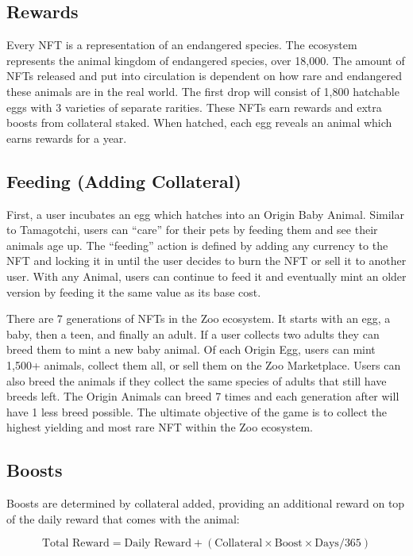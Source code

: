 \subsection{Rewards}

Every NFT is a representation of an endangered species. The ecosystem represents the animal kingdom of endangered species, over 18{,}000. The amount of NFTs released and put into circulation is dependent on how rare and endangered these animals are in the real world. The first drop will consist of 1{,}800 hatchable eggs with 3 varieties of separate rarities. These NFTs earn rewards and extra boosts from collateral staked. When hatched, each egg reveals an animal which earns rewards for a year.

\subsection{Feeding (Adding Collateral)}

First, a user incubates an egg which hatches into an Origin Baby Animal. Similar to Tamagotchi, users can ``care'' for their pets by feeding them and see their animals age up. The ``feeding'' action is defined by adding any currency to the NFT and locking it in until the user decides to burn the NFT or sell it to another user. With any Animal, users can continue to feed it and eventually mint an older version by feeding it the same value as its base cost.

There are 7 generations of NFTs in the Zoo ecosystem. It starts with an egg, a baby, then a teen, and finally an adult. If a user collects two adults they can breed them to mint a new baby animal. Of each Origin Egg, users can mint 1{,}500+ animals, collect them all, or sell them on the Zoo Marketplace. Users can also breed the animals if they collect the same species of adults that still have breeds left. The Origin Animals can breed 7 times and each generation after will have 1 less breed possible. The ultimate objective of the game is to collect the highest yielding and most rare NFT within the Zoo ecosystem.

\subsection{Boosts}

Boosts are determined by collateral added, providing an additional reward on top of the daily reward that comes with the animal:

\begin{equation}
\text{Total Reward} = \text{Daily Reward} + (\text{Collateral} \times \text{Boost} \times \text{Days}/365)
\end{equation}

